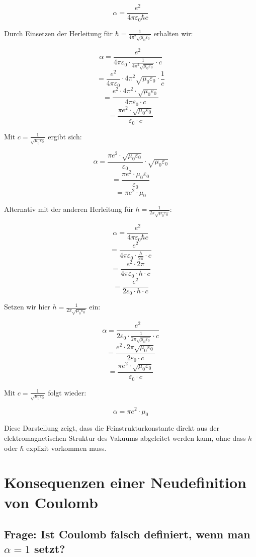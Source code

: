 \documentclass{article}
\begin{document}
	$$\alpha = \frac{e^2}{4\pi\varepsilon_0\hbar c}$$
	
	Durch Einsetzen der Herleitung für $\hbar = \frac{1}{4\pi^2\sqrt{\mu_0\varepsilon_0}}$ erhalten wir:
	
	$$\alpha = \frac{e^2}{4\pi\varepsilon_0 \cdot \frac{1}{4\pi^2\sqrt{\mu_0\varepsilon_0}} \cdot c}$$
	$$= \frac{e^2}{4\pi\varepsilon_0} \cdot 4\pi^2\sqrt{\mu_0\varepsilon_0} \cdot \frac{1}{c}$$
	$$= \frac{e^2 \cdot 4\pi^2 \cdot \sqrt{\mu_0\varepsilon_0}}{4\pi\varepsilon_0 \cdot c}$$
	$$= \frac{\pi e^2 \cdot \sqrt{\mu_0\varepsilon_0}}{\varepsilon_0 \cdot c}$$
	
	Mit $c = \frac{1}{\sqrt{\mu_0\varepsilon_0}}$ ergibt sich:
	
	$$\alpha = \frac{\pi e^2 \cdot \sqrt{\mu_0\varepsilon_0}}{\varepsilon_0} \cdot \sqrt{\mu_0\varepsilon_0}$$
	$$= \frac{\pi e^2 \cdot \mu_0\varepsilon_0}{\varepsilon_0}$$
	$$= \pi e^2 \cdot \mu_0$$
	
	Alternativ mit der anderen Herleitung für $h = \frac{1}{2\pi\sqrt{\mu_0\varepsilon_0}}$:
	
	$$\alpha = \frac{e^2}{4\pi\varepsilon_0\hbar c}$$
	$$= \frac{e^2}{4\pi\varepsilon_0 \cdot \frac{h}{2\pi} \cdot c}$$
	$$= \frac{e^2 \cdot 2\pi}{4\pi\varepsilon_0 \cdot h \cdot c}$$
	$$= \frac{e^2}{2\varepsilon_0 \cdot h \cdot c}$$
	
	Setzen wir hier $h = \frac{1}{2\pi\sqrt{\mu_0\varepsilon_0}}$ ein:
	
	$$\alpha = \frac{e^2}{2\varepsilon_0 \cdot \frac{1}{2\pi\sqrt{\mu_0\varepsilon_0}} \cdot c}$$
	$$= \frac{e^2 \cdot 2\pi\sqrt{\mu_0\varepsilon_0}}{2\varepsilon_0 \cdot c}$$
	$$= \frac{\pi e^2 \cdot \sqrt{\mu_0\varepsilon_0}}{\varepsilon_0 \cdot c}$$
	
	Mit $c = \frac{1}{\sqrt{\mu_0\varepsilon_0}}$ folgt wieder:
	
	$$\alpha = \pi e^2 \cdot \mu_0$$
	
	Diese Darstellung zeigt, dass die Feinstrukturkonstante direkt aus der elektromagnetischen Struktur des Vakuums abgeleitet werden kann, ohne dass $h$ oder $\hbar$ explizit vorkommen muss.
	
	\section{Konsequenzen einer Neudefinition von Coulomb}
	
	\subsection{Frage: Ist Coulomb falsch definiert, wenn man $\alpha = 1$ setzt?}
	
\end{document}
